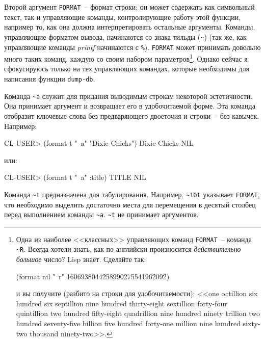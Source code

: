 Второй аргумент \lstinline{FORMAT}~-- формат строки; он может содержать как символьный текст,
так и управляющие команды, контролирующие работу этой функции, например то, как она должна
интерпретировать остальные аргументы. Команды, управляющие форматом вывода, начинаются со
знака тильды (\lstinline!~!) (так же, как управляющие команды \textit{printf} начинаются с
\lstinline{%}). \lstinline{FORMAT} может принимать довольно много таких команд, каждую со
своим набором параметров\footnote{\begin{minipage}[t]{\linewidth}
Одна из наиболее <<классных>> управляющих команд
  \lstinline{FORMAT}~-- команда \lstinline{~R}. Всегда хотели знать, как по-английски произносится
  \textit{действительно большое} число? Lisp знает. Сделайте так:

\begin{myverb}
(format nil "~r" 1606938044258990275541962092)
\end{myverb}

\noindent{}и вы получите (разбито на строки для удобочитаемости): <<one octillion six hundred six
septillion nine hundred thirty-eight sextillion forty-four quintillion two hundred
fifty-eight quadrillion nine hundred ninety trillion two hundred seventy-five billion five
hundred forty-one million nine hundred sixty-two thousand ninety-two>>.    
  \end{minipage}}\hspace{\footnotenegspace}. Однако сейчас я
сфокусируюсь только на тех управляющих командах, которые необходимы для написания функции
\lstinline{dump-db}.

Команда \lstinline{~a} служит для придания выводимым строкам некоторой эстетичности. Она
принимает аргумент и возвращает его в удобочитаемой форме. Эта команда отобразит ключевые
слова без предваряющего двоеточия и строки~-- без кавычек. Например:

\begin{myverb}
CL-USER> (format t "~a" "Dixie Chicks")
Dixie Chicks
NIL
\end{myverb}

\noindent{}или:

\begin{myverb}
CL-USER> (format t "~a" :title)
TITLE
NIL
\end{myverb}

Команда \lstinline{~t} предназначена для табулирования. Например, \lstinline{~10t} указывает
\lstinline{FORMAT}, что необходимо выделить достаточно места для перемещения в десятый столбец
перед выполнением команды \lstinline{~a}. \lstinline{~t} не принимает аргументов.

